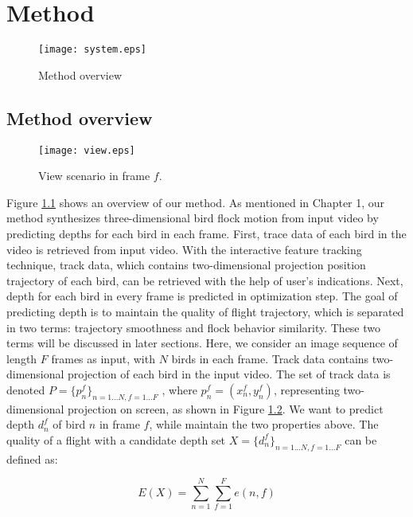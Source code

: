 \chapter{Method}


\begin{figure}[h]
 \begin{center}
  \texttt{[image: system.eps]}
 \end{center}
 \caption{Method overview}
 \label{figure:system}
\end{figure}


\section{Method overview}


\begin{figure}[h]
 \begin{center}
  \texttt{[image: view.eps]}
 \end{center}
 \caption{View scenario in frame $f$.}
 \label{figure:view}
\end{figure}


Figure \ref{figure:system}  shows an overview of our method. As mentioned in Chapter 1, our method synthesizes three-dimensional bird flock motion from input video by predicting depths for each bird in each frame. First, trace data of each bird in the video is retrieved from input video. With the interactive feature tracking technique, track data, which contains two-dimensional projection position trajectory of each bird, can be retrieved with the help of user's indications. Next, depth for each bird in every frame is predicted in optimization step. The goal of predicting depth is to maintain the quality of flight trajectory, which is separated in two terms: trajectory smoothness and flock behavior similarity. These two terms will be discussed in later sections. Here, we consider an image sequence of length $F$ frames as input, with $N$ birds in each frame. Track data contains two-dimensional projection of each bird in the input video. The set of track data is denoted $P=\big\{p_n^f\big\}_{n=1...N,f=1...F}$ , where $p_n^f=(x_n^f, y_n^f)$, representing two-dimensional projection on screen, as shown in Figure \ref{figure:view}. We want to predict depth $d_n^f$ of bird $n$ in frame $f$, while maintain the two properties above. The quality of a flight with a candidate depth set $X=\big\{d_n^f\big\}_{n=1...N,f=1...F}$ can be defined as:


\begin{equation}\label{eq:1}
 E(X) = \sum_{n = 1}^{N} \sum_{f = 1}^{F}e(n,f)
\end{equation}


